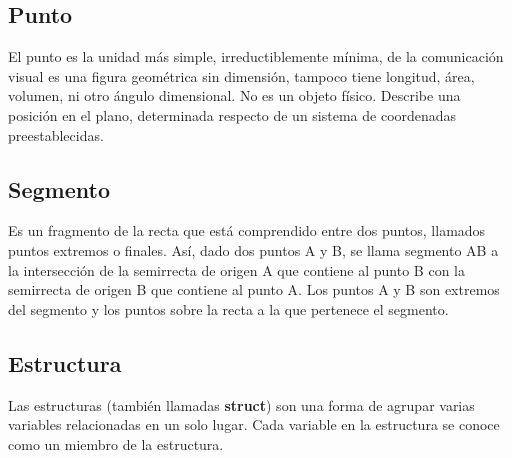 \subsection{Punto}
El punto es la unidad más simple, irreductiblemente mínima, de la comunicación visual es una figura 
geométrica sin dimensión, tampoco tiene longitud, área, volumen, ni otro ángulo dimensional. No es un 
objeto físico. Describe una posición en el plano, determinada respecto de un sistema de coordenadas 
preestablecidas. 


\subsection{Segmento}
Es un fragmento de la recta que está comprendido entre dos puntos, llamados puntos extremos o finales. Así, dado dos puntos A y B, se llama segmento AB a la intersección de la semirrecta de origen A que contiene al punto B con la semirrecta de origen B que contiene al punto A. Los puntos A y B son extremos del segmento y los puntos sobre la recta a la que pertenece el segmento.




\subsection{Estructura}
Las estructuras (también llamadas \textbf{struct}) son una forma de agrupar varias variables relacionadas en un solo lugar. Cada variable en la estructura se conoce como un miembro de la estructura.







